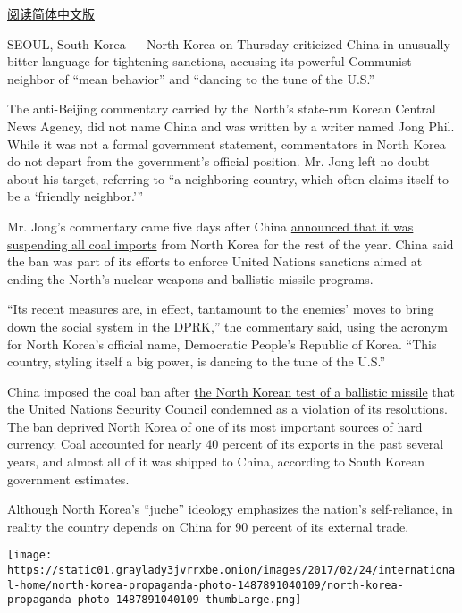 \href{http://cn.nytimes3xbfgragh.onion/asia-pacific/20170224/north-korea-china/}{阅读简体中文版}

SEOUL, South Korea --- North Korea on Thursday criticized China in
unusually bitter language for tightening sanctions, accusing its
powerful Communist neighbor of ``mean behavior'' and ``dancing to the
tune of the U.S.''

The anti-Beijing commentary carried by the North's state-run Korean
Central News Agency, did not name China and was written by a writer
named Jong Phil. While it was not a formal government statement,
commentators in North Korea do not depart from the government's official
position. Mr. Jong left no doubt about his target, referring to ``a
neighboring country, which often claims itself to be a `friendly
neighbor.'''

Mr. Jong's commentary came five days after China
\href{https://www.nytimes3xbfgragh.onion/2017/02/18/world/asia/north-korea-china-coal-imports-suspended.html}{announced
that it was suspending all coal imports} from North Korea for the rest
of the year. China said the ban was part of its efforts to enforce
United Nations sanctions aimed at ending the North's nuclear weapons and
ballistic-missile programs.

``Its recent measures are, in effect, tantamount to the enemies' moves
to bring down the social system in the DPRK,'' the commentary said,
using the acronym for North Korea's official name, Democratic People's
Republic of Korea. ``This country, styling itself a big power, is
dancing to the tune of the U.S.''

China imposed the coal ban after
\href{https://www.nytimes3xbfgragh.onion/2017/02/11/world/asia/north-korea-missile-test-trump.html}{the
North Korean test of a ballistic missile} that the United Nations
Security Council condemned as a violation of its resolutions. The ban
deprived North Korea of one of its most important sources of hard
currency. Coal accounted for nearly 40 percent of its exports in the
past several years, and almost all of it was shipped to China, according
to South Korean government estimates.

Although North Korea's ``juche'' ideology emphasizes the nation's
self-reliance, in reality the country depends on China for 90 percent of
its external trade.

\href{https://www.nytimes3xbfgragh.onion/interactive/2017/02/24/world/asia/north-korea-propaganda-photo.html}{}

\texttt{[image: https://static01.graylady3jvrrxbe.onion/images/2017/02/24/international-home/north-korea-propaganda-photo-1487891040109/north-korea-propaganda-photo-1487891040109-thumbLarge.png]}

